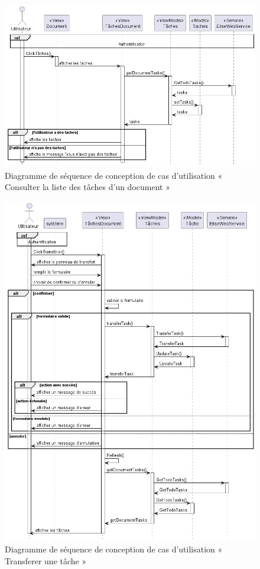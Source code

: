 \begin{figure}[H]
  \centering
  \includegraphics[width=1\textwidth]{out/diagrams/documents/sequence_preview_tasks/sequence_preview_tasks}
  \caption{Diagramme de séquence de conception de cas d'utilisation « Consulter la liste des tâches d'un document »}
  \label{fig:sequence_conception_previewTasks}
\end{figure}
\begin{figure}[H]
  \centering
  \includegraphics[width=1\textwidth]{out/diagrams/documents/sequence_transfer_task/sequence_transfer_task}
  \caption{Diagramme de séquence de conception de cas d'utilisation « Transferer une tâche »}
  \label{fig:sequence_conception_transferTask}
\end{figure}
